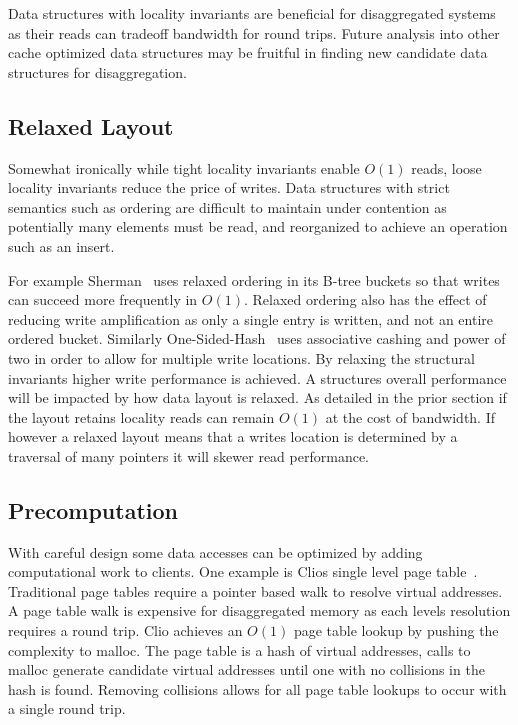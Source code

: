 Data structures with locality invariants are beneficial for disaggregated
systems as their reads can tradeoff bandwidth for round trips. Future
analysis into other cache optimized data structures may be fruitful in finding
new candidate data structures for disaggregation.

\subsection{Relaxed Layout} 

Somewhat ironically while tight locality invariants enable $O(1)$ reads, loose
locality invariants reduce the price of writes. Data structures with strict
semantics such as ordering are difficult to maintain under contention as
potentially many elements must be read, and reorganized to achieve an operation
such as an insert.

For example Sherman~\cite{sherman} uses relaxed ordering in its B-tree buckets
so that writes can succeed more frequently in $O(1)$. Relaxed ordering also has
the effect of reducing write amplification as only a single entry is written,
and not an entire ordered bucket. Similarly One-Sided-Hash~\cite{one-sided-hash}
uses associative cashing and power of two in order to allow for multiple write
locations. By relaxing the structural invariants higher write performance is
achieved. A structures overall performance will be impacted by how data layout
is relaxed. As detailed in the prior section if the layout retains locality
reads can remain $O(1)$ at the cost of bandwidth. If however a relaxed layout
means that a writes location is determined by a traversal of many pointers it
will skewer read performance.


\subsection{Precomputation} 

With careful design some data accesses can be optimized by adding computational
work to clients. One example is Clios single level page table~\cite{clio}.
Traditional page tables require a pointer based walk to resolve virtual
addresses. A page table walk is expensive for disaggregated memory as each
levels resolution requires a round trip. Clio achieves an $O(1)$ page table
lookup by pushing the complexity to malloc. The page table is a hash of virtual
addresses, calls to malloc generate candidate virtual addresses until one with
no collisions in the hash is found. Removing collisions allows for all page
table lookups to occur with a single round trip.

